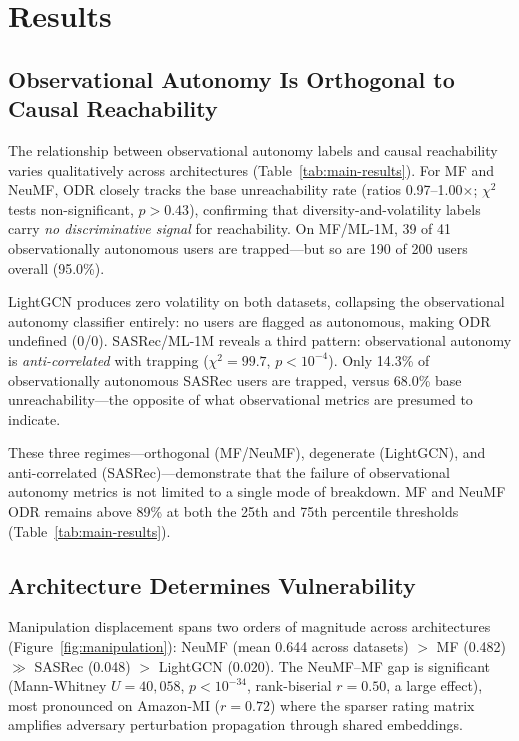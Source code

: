 \documentclass[sigconf,anonymous]{acmart}
\begin{document}
\section{Results}
\label{sec:results}




\subsection{Observational Autonomy Is Orthogonal to Causal Reachability}

The relationship between observational autonomy labels and causal reachability varies qualitatively across architectures (Table~\ref{tab:main-results}). For MF and NeuMF, ODR closely tracks the base unreachability rate (ratios 0.97--1.00$\times$; $\chi^2$ tests non-significant, $p > 0.43$), confirming that diversity-and-volatility labels carry \emph{no discriminative signal} for reachability. On MF/ML-1M, 39 of 41 observationally autonomous users are trapped---but so are 190 of 200 users overall (95.0\%).

LightGCN produces zero volatility on both datasets, collapsing the observational autonomy classifier entirely: no users are flagged as autonomous, making ODR undefined (0/0). SASRec/ML-1M reveals a third pattern: observational autonomy is \emph{anti-correlated} with trapping ($\chi^2 = 99.7$, $p < 10^{-4}$). Only 14.3\% of observationally autonomous SASRec users are trapped, versus 68.0\% base unreachability---the opposite of what observational metrics are presumed to indicate.

These three regimes---orthogonal (MF/NeuMF), degenerate (LightGCN), and anti-correlated (SASRec)---demonstrate that the failure of observational autonomy metrics is not limited to a single mode of breakdown. MF and NeuMF ODR remains above 89\% at both the 25th and 75th percentile thresholds (Table~\ref{tab:main-results}).

\subsection{Architecture Determines Vulnerability}

Manipulation displacement spans two orders of magnitude across architectures (Figure~\ref{fig:manipulation}): NeuMF (mean 0.644 across datasets) $>$ MF (0.482) $\gg$ SASRec (0.048) $>$ LightGCN (0.020). The NeuMF--MF gap is significant (Mann-Whitney $U = 40{,}058$, $p < 10^{-34}$, rank-biserial $r = 0.50$, a large effect), most pronounced on Amazon-MI ($r = 0.72$) where the sparser rating matrix amplifies adversary perturbation propagation through shared embeddings.
\end{document}

